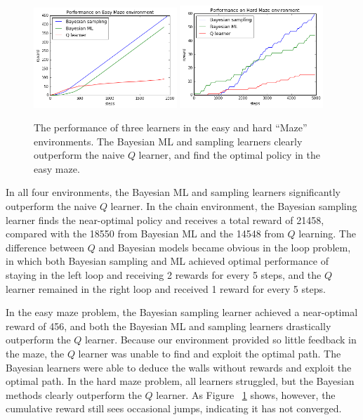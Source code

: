 \documentclass[10pt, twocolumn, twoside]{article}
\begin{document}
\begin{figure}
\centering
\includegraphics[width=0.48\textwidth]{smallMazePerf.png}
\includegraphics[width=0.48\textwidth]{largeMazePerf.png}
\caption{\label{fig:easyhardPerf} The performance of three learners in the easy and hard ``Maze''
environments. The Bayesian ML and sampling learners clearly outperform the naive $Q$ learner, and
find the optimal policy in the easy maze.}
\end{figure}

In all four environments, the Bayesian ML and sampling learners significantly outperform the naive
$Q$ learner. In the chain environment, the Bayesian sampling learner finds the near-optimal policy and
receives a total reward of 21458, compared with the 18550 from Bayesian ML and the 14548 from $Q$ learning.
The difference between $Q$ and Bayesian models became obvious in the loop problem, in which both Bayesian
sampling and ML achieved optimal performance of staying in the left loop and receiving 2 rewards for every
5 steps, and the $Q$ learner remained in the right loop and received 1 reward for every 5 steps.

In the easy maze problem, the Bayesian sampling learner achieved a near-optimal reward of 456, and both the
Bayesian ML and sampling learners drastically outperform the $Q$ learner. Because our environment provided
so little feedback in the maze, the $Q$ learner was unable to find and exploit the optimal path. The Bayesian
learners were able to deduce the walls without rewards and exploit the optimal path. In the hard maze problem,
all learners struggled, but the Bayesian methods clearly outperform the $Q$ learner. As Figure ~\ref{fig:easyhardPerf}
shows, however, the cumulative reward still sees occasional jumps, indicating it has not converged.
\end{document}
